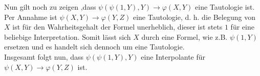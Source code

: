 \documentclass[11pt, a4paper]{article}
\begin{document}
\begin{adjustwidth}{20pt}{20pt}
Nun gilt noch zu zeigen ,dass $\psi(\psi(1,Y),Y) \rightarrow \varphi(X,Y)$ eine Tautologie ist. Per Annahme ist $\psi(X,Y)\rightarrow \varphi(Y,Z)$ eine Tautologie, d. h. die Belegung von $X$ ist für den Wahrheitsgehalt der Formel unerheblich, dieser ist stets $1$ für eine beliebige Interpretation. Somit lässt sich $X$ durch eine Formel, wie z.B. $\psi(1,Y)$ ersetzen und es handelt sich dennoch um eine Tautologie.\\

Insgesamt folgt nun, dass $\psi(\psi(1,Y),Y)$ eine Interpolante für $\psi(X,Y) \rightarrow \varphi(Y,Z)$ ist.
 
\end{adjustwidth}
\end{document}
